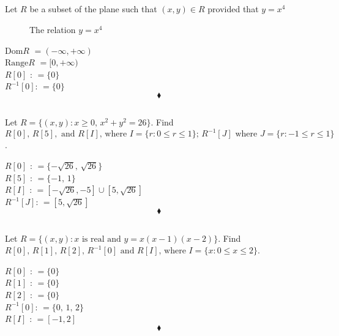 \subsection{}
\begin{tcolorbox}
 Let $R$ be a subset of the plane such that $(x,y)\in R$ provided that $y=x^4$
\end{tcolorbox}
\begin{figure}[H]%
    \centering
    
\caption{The relation $y=x^4$}
\label{fig:fig_p8b}
\end{figure}
$$ $$
\textbf{$\text{Dom}R$} $=(-\infty,+\infty)$\\
\textbf{$\text{Range} R$} $=[0,+\infty)$\\
\textbf{$R[0]$ }:  $=\{0\}$\\
\textbf{$R^{-1}[0]$}:  $=\{0\}$\\
$$\blacklozenge$$


\subsection{}
\begin{tcolorbox}
 Let $R=\{(x,y):x\ge 0,\, x^2+y^2=26\}$. Find $R[0],\, R[5],\text{ and } R[I]\text{, where } I= \{r:0\le r\le 1\};\, R^{-1}[J]\text{ where } J=  \{r:-1\le r\le 1\}$.
\end{tcolorbox}
$$ $$
\textbf{$R[0]$ }:  $=\{-\sqrt{26},\,\sqrt{26} \}$\\
\textbf{$R[5]$ }:  $=\{-1,\,1 \}$\\
\textbf{$R[I]$ }:  $=[-\sqrt{26},-5]\cup [5,\sqrt{26}] $\\
\textbf{$R^{-1}[J]$}:  $=[5,\sqrt{26}]$\\
$$\blacklozenge$$

\subsection{}
\begin{tcolorbox}
 Let $R=\{(x,y):x\text{ is real and }y=x(x-1)(x-2)\}$. Find $R[0],\, R[1],\, R[2],\, R^{-1}[0]\text{ and } R[I]\text{, where } I= \{x:0\le x\le 2\}$.
\end{tcolorbox}
$$ $$ 
\textbf{$R[0]$ }:  $=\{0\}$\\
\textbf{$R[1]$ }: $=\{0 \}$\\
\textbf{$R[2]$ }:   $=\{0 \}$\\
\textbf{$R^{-1}[0]$}:  $=\{0,\, 1 ,\, 2 \}$\\
\textbf{$R[I]$ }:  $=[-1,2] $\\
$$\blacklozenge$$

